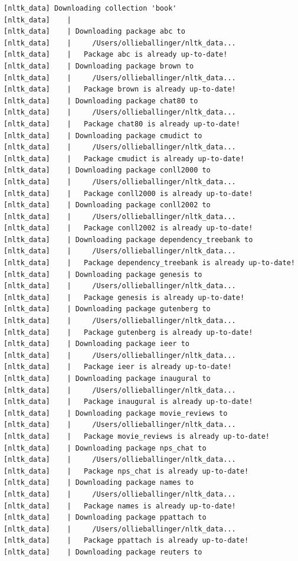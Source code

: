 \documentclass[
  letterpaper,
  DIV=11,
  numbers=noendperiod]{scrreprt}
\begin{document}
\begin{verbatim}
[nltk_data] Downloading collection 'book'
[nltk_data]    | 
[nltk_data]    | Downloading package abc to
[nltk_data]    |     /Users/ollieballinger/nltk_data...
[nltk_data]    |   Package abc is already up-to-date!
[nltk_data]    | Downloading package brown to
[nltk_data]    |     /Users/ollieballinger/nltk_data...
[nltk_data]    |   Package brown is already up-to-date!
[nltk_data]    | Downloading package chat80 to
[nltk_data]    |     /Users/ollieballinger/nltk_data...
[nltk_data]    |   Package chat80 is already up-to-date!
[nltk_data]    | Downloading package cmudict to
[nltk_data]    |     /Users/ollieballinger/nltk_data...
[nltk_data]    |   Package cmudict is already up-to-date!
[nltk_data]    | Downloading package conll2000 to
[nltk_data]    |     /Users/ollieballinger/nltk_data...
[nltk_data]    |   Package conll2000 is already up-to-date!
[nltk_data]    | Downloading package conll2002 to
[nltk_data]    |     /Users/ollieballinger/nltk_data...
[nltk_data]    |   Package conll2002 is already up-to-date!
[nltk_data]    | Downloading package dependency_treebank to
[nltk_data]    |     /Users/ollieballinger/nltk_data...
[nltk_data]    |   Package dependency_treebank is already up-to-date!
[nltk_data]    | Downloading package genesis to
[nltk_data]    |     /Users/ollieballinger/nltk_data...
[nltk_data]    |   Package genesis is already up-to-date!
[nltk_data]    | Downloading package gutenberg to
[nltk_data]    |     /Users/ollieballinger/nltk_data...
[nltk_data]    |   Package gutenberg is already up-to-date!
[nltk_data]    | Downloading package ieer to
[nltk_data]    |     /Users/ollieballinger/nltk_data...
[nltk_data]    |   Package ieer is already up-to-date!
[nltk_data]    | Downloading package inaugural to
[nltk_data]    |     /Users/ollieballinger/nltk_data...
[nltk_data]    |   Package inaugural is already up-to-date!
[nltk_data]    | Downloading package movie_reviews to
[nltk_data]    |     /Users/ollieballinger/nltk_data...
[nltk_data]    |   Package movie_reviews is already up-to-date!
[nltk_data]    | Downloading package nps_chat to
[nltk_data]    |     /Users/ollieballinger/nltk_data...
[nltk_data]    |   Package nps_chat is already up-to-date!
[nltk_data]    | Downloading package names to
[nltk_data]    |     /Users/ollieballinger/nltk_data...
[nltk_data]    |   Package names is already up-to-date!
[nltk_data]    | Downloading package ppattach to
[nltk_data]    |     /Users/ollieballinger/nltk_data...
[nltk_data]    |   Package ppattach is already up-to-date!
[nltk_data]    | Downloading package reuters to

\end{verbatim}
\end{document}
